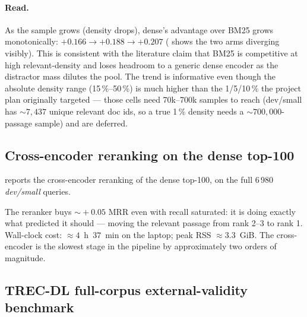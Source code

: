 \documentclass[11pt,a4paper]{article}
\newcommand{\devsmall}{\textit{dev/small}}
\newcommand{\fdev}{6\,980}
\newcommand{\bmtwofive}{BM25}
\begin{document}
\paragraph{Read.}  As the sample grows (density drops), dense's
advantage over \bmtwofive{} grows monotonically: $+0.166 \to +0.188
\to +0.207$ ( shows the two arms
diverging visibly).  This is consistent with the literature claim
that \bmtwofive{} is competitive at high relevant-density and loses
headroom to a generic dense encoder as the distractor mass dilutes
the pool.  The trend is informative even though the absolute
density range (15\,\%--50\,\%) is much higher than the 1/5/10\,\%
the project plan originally targeted --- those cells need 70k--700k
samples to reach (dev/small has $\sim\!7{,}437$ unique relevant
doc ids, so a true 1\,\% density needs a $\sim\!700{,}000$-passage
sample) and are deferred.

\subsection{Cross-encoder reranking on the dense top-100}
\label{sec:w5-dense-rerank}

 reports the cross-encoder reranking of the
dense top-100, on the full \fdev{} \devsmall{} queries.

\begin{table}[H]
  \centering
  \caption{Cross-encoder reranking of the dense top-100,
  \fdev{} \devsmall{} queries.  Reranker: \texttt{cross-encoder/
  ms-marco-MiniLM-L-6-v2} at depth $K\!=\!100$.  Recall@100 is
  unchanged by construction (the reranker is order-only).  The
  earlier 1\,000-query subsample produced consistent deltas
  (MRR $\Delta\!=\!+0.0435$, nDCG $\Delta\!=\!+0.0398$), so the
  full-dev gain is not a subsample artefact.}
  \label{tab:w5-results}
  
\end{table}

The reranker buys $\sim\!+0.05$ MRR even with recall saturated: it
is doing exactly what  predicted it should ---
moving the relevant passage from rank 2--3 to rank 1.  Wall-clock
cost: $\approx 4$~h~$37$~min on the laptop;
peak RSS $\approx 3.3$~GiB.  The cross-encoder is the slowest stage
in the pipeline by approximately two orders of magnitude.

\subsection{TREC-DL full-corpus external-validity benchmark}
\label{sec:trec-dl-results}
\end{document}
